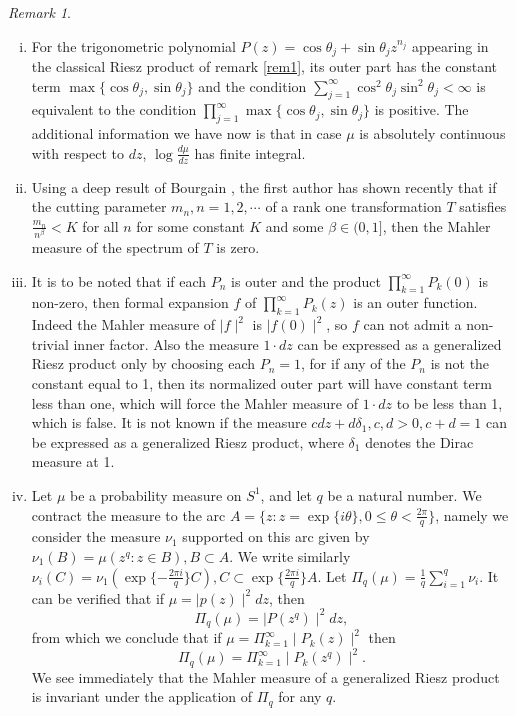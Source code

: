 \documentclass{amsart}
\theoremstyle{definition}
\theoremstyle{remark}
\newtheorem{rem}[Th]{Remark}
\numberwithin{equation}{section}
\newcommand{\1}{\mathbb{1}}
\begin{document}
\begin{rem}\label{rem2}\begin{enumerate}[i)]
\item \textnormal{For the trigonometric polynomial $P(z) = \cos \theta_j + \sin \theta_j z^{n_j}$ appearing in the classical Riesz product of  remark \ref{rem1}, its outer part has the constant term $ \max \{\cos \theta_j, \sin \theta_j\}$ and the condition
$\sum_{j=1}^\infty\cos^2\theta_j\sin^2\theta_j <\infty$ is equivalent to the condition
$ \prod_{j=1}^\infty \max \{\cos \theta_j, \sin \theta_j\}$ is positive. The additional information we have now is that in case $\mu$ is absolutely continuous with respect to $dz$, $\log\frac{d\mu}{dz}$ has finite integral.}

 \item \textnormal{ Using a deep result of Bourgain \cite{bourgain}, the first author has shown recently \cite{elabdal} that if the cutting parameter $m_n, n=1,2,\cdots$ of a rank one transformation $T$ satisfies
$\frac{m_n}{n^\beta} < K$ for all $n$ for some constant $K$ and some $\beta \in (0,1]$, then the Mahler measure of the spectrum of $T$ is zero.}
\item \textnormal{It is to be noted that if each $P_n$ is outer and the product
$\prod_{k=1}^\infty P_k(0)$ is non-zero, then formal expansion $f$ of $\prod_{k=1}^\infty P_k(z)$ is an outer function. Indeed the  Mahler measure of $\mid f\mid^2$ is $\mid f(0)\mid^2$, so $f$ can not admit a non-trivial inner factor. Also the measure $1\cdot dz$ can be expressed as a generalized Riesz product only by choosing each $P_n =1$, for if any of the $P_n$ is not the constant equal to 1, then its normalized outer part will have constant term less than one, which will force the Mahler measure of $1\cdot dz$ to be less than 1, which is false. It is not known if the measure $cdz + d\delta_{1}, c, d > 0, c+d =1$ can be expressed as a generalized Riesz product, where $\delta_{1}$ denotes the Dirac measure at
1.}
\item \textnormal{ Let $\mu$ be a probability measure on $S^1$, and let $q$ be a natural number. We contract the measure to the arc $A = \{z: z = \exp\{i\theta\}, 0\leq \theta <\frac{2\pi}{q}\}$, namely we consider the measure $\nu_1$ supported on this arc given by $\nu_1(B) = \mu ({z^q: z \in B}), B \subset A$. We write similarly $\nu_i(C)  = \nu_1(\exp\{-\frac{2\pi i}q\}C), C \subset \exp\{\frac{2\pi i}{q}\}A.$ Let
    $\Pi_q(\mu)= \frac{1}{q}\sum_{i=1}^q\nu_i.$
  It can be verified that if $\mu =\mid p(z)\mid^2dz$, then $$\Pi_q(\mu) = \mid P(z^q)\mid^2dz,$$ from which we conclude that
  if $\mu = \Pi_{k=1}^\infty\mid P_k(z)\mid^2$ then
  $$\Pi_q(\mu) = \Pi_{k=1}^\infty\mid P_k(z^q)\mid^2.$$
We see immediately that the Mahler measure of a generalized Riesz product is
invariant under the application of $\Pi_q$ for any $q$.}

\end{enumerate}
\end{rem}
\end{document}
